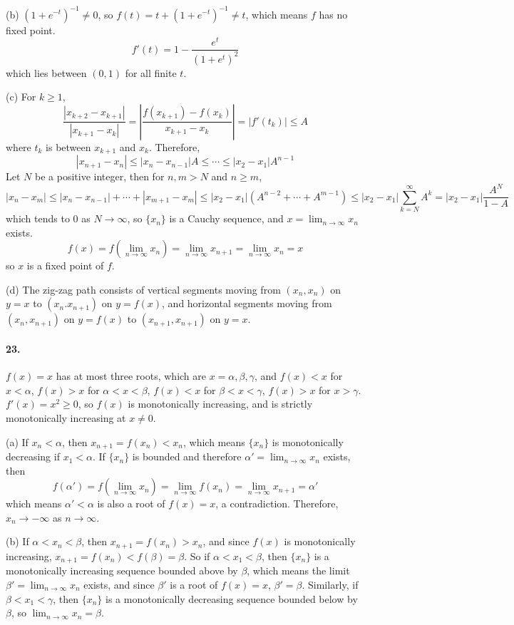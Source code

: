\documentclass[a4paper]{article}
\begin{document}
(b)
$(1+e^{-t})^{-1}\neq0$, so $f(t)=t+(1+e^{-t})^{-1}\neq t$, which means $f$ has no fixed point.
\[
f'(t)=1-\frac{e^t}{(1+e^t)^2}
\]
which lies between $(0,1)$ for all finite $t$.
\medskip

(c)
For $k\geq1$,
\[
\frac{|x_{k+2}-x_{k+1}|}{|x_{k+1}-x_k|}=\left|\frac{f(x_{k+1})-f(x_k)}{x_{k+1}-x_k} \right|=\left|f'(t_k) \right|\leq A
\]
where $t_k$ is between $x_{k+1}$ and $x_k$. Therefore,
\[
|x_{n+1}-x_n|\leq|x_n-x_{n-1}|A\leq\cdots\leq|x_2-x_1|A^{n-1}
\]
Let $N$ be a positive integer, then for $n,m>N$ and $n\geq m$,
\[
|x_n-x_m|\leq|x_n-x_{n-1}|+\cdots+|x_{m+1}-x_m|\leq |x_2-x_1|(A^{n-2}+\cdots+A^{m-1})\leq|x_2-x_1|\sum_{k=N}^\infty A^k=|x_2-x_1|\frac{A^N}{1-A}
\]
which tends to $0$ as $N\to\infty$, so $\{x_n\}$ is a Cauchy sequence, and $x=\lim_{n\to\infty}x_n$ exists.
\[
f(x)=f(\lim_{n\to\infty}x_n)=\lim_{n\to\infty}x_{n+1}=\lim_{n\to\infty}x_n=x
\]
so $x$ is a fixed point of $f$.
\medskip

(d)
The zig-zag path consists of vertical segments moving from $(x_n,x_n)$ on $y=x$ to $(x_n.x_{n+1})$ on $y=f(x)$, and horizontal segments moving from $(x_n,x_{n+1})$ on $y=f(x)$ to $(x_{n+1},x_{n+1})$ on $y=x$.

\paragraph{23.}
$f(x)=x$ has at most three roots, which are $x=\alpha,\beta,\gamma$, and $f(x)<x$ for $x<\alpha$,\; $f(x)>x$ for $\alpha<x<\beta$,\; $f(x)<x$ for $\beta<x<\gamma$,\; $f(x)>x$ for $x>\gamma$.\; $f'(x)=x^2\geq0$, so $f(x)$ is monotonically increasing, and is strictly monotonically increasing at $x\neq0$.
\medskip

(a) If $x_n<\alpha$, then $x_{n+1}=f(x_n)<x_n$, which means $\{x_n\}$ is monotonically decreasing if $x_1<\alpha$. If $\{x_n\}$ is bounded and therefore $\alpha'=\lim_{n\to\infty}x_n$ exists, then 
\[
f(\alpha')=f(\lim_{n\to\infty}x_n)=\lim_{n\to\infty}f(x_n)=\lim_{n\to\infty}x_{n+1}=\alpha'
\]
which means $\alpha'<\alpha$ is also a root of $f(x)=x$, a contradiction. Therefore, $x_n\to-\infty$ as $n\to\infty$.
\medskip

(b)
If $\alpha<x_n<\beta$, then $x_{n+1}=f(x_n)>x_n$, and since $f(x)$ is monotonically increasing, $x_{n+1}=f(x_n)<f(\beta)=\beta$. So if $\alpha<x_1<\beta$, then $\{x_n\}$ is a monotonically increasing sequence bounded above by $\beta$, which means the limit $\beta'=\lim_{n\to\infty}x_n$ exists, and since $\beta'$ is a root of $f(x)=x$,\; $\beta'=\beta$. Similarly, if $\beta<x_1<\gamma$, then $\{x_n\}$ is a monotonically decreasing sequence bounded below by $\beta$, so $\lim_{n\to\infty}x_n=\beta$.
\medskip
\end{document}
